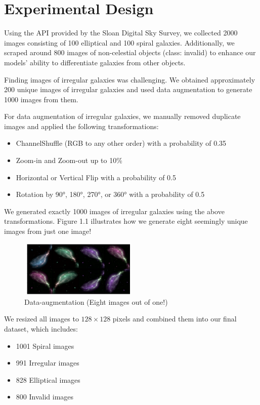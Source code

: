 \section{Experimental Design}

Using the API provided by the Sloan Digital Sky Survey, we collected 2000 images consisting of 100 elliptical and 100 spiral galaxies. Additionally, we scraped around 800 images of non-celestial objects (class: invalid) to enhance our models' ability to differentiate galaxies from other objects.

Finding images of irregular galaxies was challenging. We obtained approximately 200 unique images of irregular galaxies and used data augmentation to generate 1000 images from them.

For data augmentation of irregular galaxies, we manually removed duplicate images and applied the following transformations:
\begin{itemize}
    \item ChannelShuffle (RGB to any other order) with a probability of 0.35
    \item Zoom-in and Zoom-out up to 10\%
    \item Horizontal or Vertical Flip with a probability of 0.5
    \item Rotation by 90°, 180°, 270°, or 360° with a probability of 0.5
\end{itemize}

We generated exactly 1000 images of irregular
galaxies using the above transformations. Figure 1.1
illustrates how we generate eight seemingly unique
images from just one image!

\begin{figure}[H]
    \centering
    \includegraphics[width=0.5\textwidth]{Images/augmented-sample.png}
    \caption{Data-augmentation (Eight images out of one!)}
    \label{fig:enter-label}
\end{figure}

We resized all images to \(128 \times 128\) pixels and combined them into our final dataset, which includes:

\begin{itemize}
    \item 1001 Spiral images
    \item 991 Irregular images
    \item 828 Elliptical images
    \item 800 Invalid images
\end{itemize}

